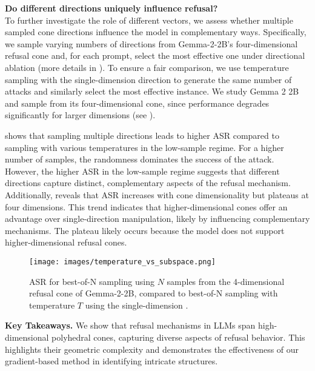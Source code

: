 \textbf{Do different directions uniquely influence refusal?}\\
To further investigate the role of different vectors, we assess whether multiple sampled cone directions influence the model in complementary ways. Specifically, we sample varying numbers of directions from Gemma-2-2B's four-dimensional refusal cone and, for each prompt, select the most effective one under directional ablation (more details in ). To ensure a fair comparison, we use temperature sampling with the single-dimension \oursacro direction to generate the same number of attacks and similarly select the most effective instance. We study Gemma 2 2B and sample from its four-dimensional cone, since performance degrades significantly for larger dimensions (see ).

 shows that sampling multiple directions leads to higher ASR compared to sampling with various temperatures in the low-sample regime. For a higher number of samples, the randomness dominates the success of the attack. However, the higher ASR in the low-sample regime suggests that different directions capture distinct, complementary aspects of the refusal mechanism. Additionally, 
reveals that ASR increases with cone dimensionality but plateaus at four dimensions. This trend indicates that higher-dimensional cones offer an advantage over single-direction manipulation, likely by influencing complementary mechanisms. The plateau likely occurs because the model does not support higher-dimensional refusal cones.
\begin{figure}[h]
    \centering
    \texttt{[image: images/temperature\_vs\_subspace.png]}
    \caption{ASR for best-of-N sampling using $N$ samples from the 4-dimensional refusal cone of Gemma-2-2B, compared to best-of-N sampling with temperature $T$ using the single-dimension \oursacro.}
    \label{fig:asr_over_sampling}
\end{figure}
\begin{mybox}
    \textbf{Key Takeaways.} We show that refusal mechanisms in LLMs span high-dimensional polyhedral cones, capturing diverse aspects of refusal behavior. This highlights their geometric complexity and demonstrates the effectiveness of our gradient-based method in identifying intricate structures.
\end{mybox}
